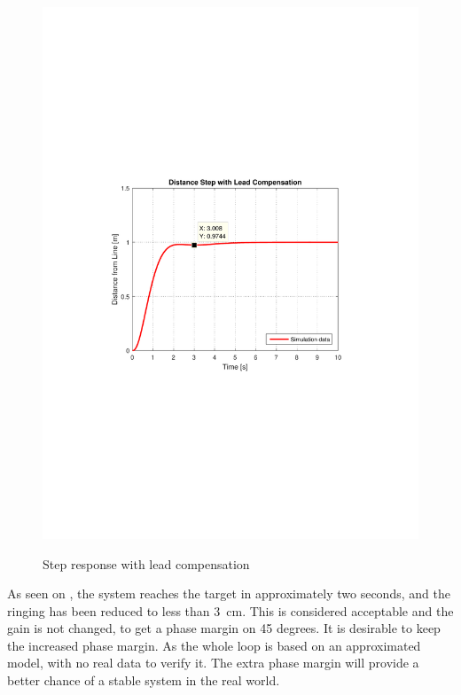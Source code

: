 \begin{figure}[H]
  \centering
  {
    \includegraphics[width=1.4\textwidth]{figures/distanceStep3.pdf}
  }
  \caption{Step response with lead compensation}
  \label{SimulationSteeringP3}
\end{figure}
As seen on , the system reaches the target in approximately two seconds, and the ringing has been reduced to less than \SI{3}{cm}. This is considered acceptable and the gain is not changed, to get a phase margin on 45 degrees. It is desirable to keep the increased phase margin. As the whole loop is based on an approximated model, with no real data to verify it. The extra phase margin will provide a better chance of a stable system in the real world.